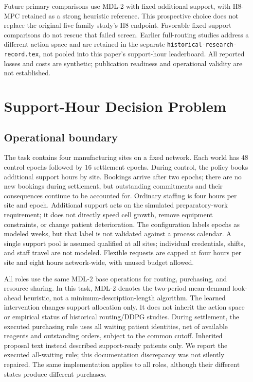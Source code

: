 \documentclass[preprint,review,12pt]{elsarticle}
\begin{document}
Future primary comparisons use MDL-2 with fixed additional support, with H8-MPC
retained as a strong heuristic reference. This prospective choice does not
replace the original five-family study's H8 endpoint. Favorable fixed-support
comparisons do not rescue that failed screen. Earlier full-routing studies
address a different action space and are retained in the separate
\texttt{historical-research-record.tex}, not pooled into this paper's
support-hour leaderboard. All reported losses and costs are synthetic;
publication readiness and operational validity are not established.

\section{Support-Hour Decision Problem}
\label{sec:problem}
\subsection{Operational boundary}
The task contains four manufacturing sites on a fixed network. Each world
has 48 control epochs followed by 16 settlement epochs. During control,
the policy books additional support hours by site. Bookings arrive after
two epochs; there are no new bookings during settlement, but outstanding
commitments and their consequences continue to be accounted for. Ordinary
staffing is four hours per site and epoch. Additional support acts on the
simulated preparatory-work requirement; it does not directly speed cell
growth, remove equipment constraints, or change patient deterioration.
The configuration labels epochs as modeled weeks, but that label is not
validated against a process calendar. A single support pool is assumed
qualified at all sites; individual credentials, shifts, and staff travel
are not modeled. Flexible requests are capped at four hours per site and
eight hours network-wide, with unused budget allowed.

All roles use the same MDL-2 base operations for routing, purchasing, and
resource sharing. In this task, MDL-2 denotes the two-period mean-demand
look-ahead heuristic, not a minimum-description-length algorithm. The
learned intervention changes support allocation only. It does not inherit
the action space or empirical status of historical routing/DDPG studies.
During settlement, the executed purchasing rule uses all waiting patient
identities, net of available reagents and outstanding orders, subject to
the common cutoff. Inherited proposal text instead described support-ready
patients only. We report the executed all-waiting rule; this documentation
discrepancy was not silently repaired. The same implementation applies to
all roles, although their different states produce different purchases.
\end{document}
